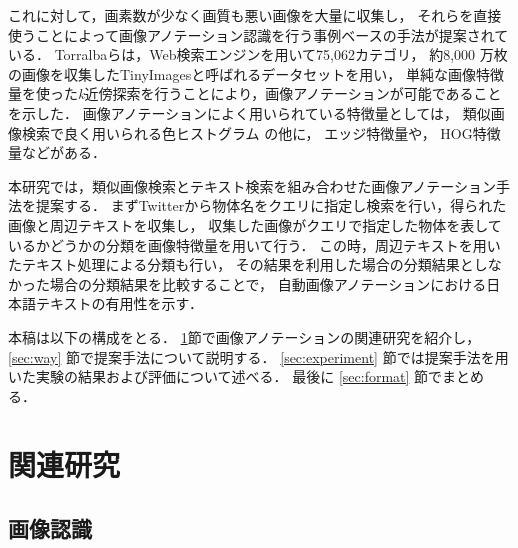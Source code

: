 これに対して，画素数が少なく画質も悪い画像を大量に収集し，
それらを直接使うことによって画像アノテーション認識を行う事例ベースの手法が提案されている．
Torralba\cite{torralba}らは，Web検索エンジンを用いて75,062カテゴリ，
約8,000 万枚の画像を収集したTinyImagesと呼ばれるデータセットを用い，
単純な画像特徴量を使った{\it k}近傍探索を行うことにより，画像アノテーションが可能であることを示した．
%
%
%
画像アノテーションによく用いられている特徴量としては，
類似画像検索で良く用いられる色ヒストグラム
の他に，
エッジ特徴量や，
HOG特徴量\cite{dalal}などがある．

本研究では，類似画像検索とテキスト検索を組み合わせた画像アノテーション手法を提案する．
まずTwitterから物体名をクエリに指定し検索を行い，得られた画像と周辺テキストを収集し，
収集した画像がクエリで指定した物体を表しているかどうかの分類を画像特徴量を用いて行う．
この時，周辺テキストを用いたテキスト処理による分類も行い，
その結果を利用した場合の分類結果としなかった場合の分類結果を比較することで，
自動画像アノテーションにおける日本語テキストの有用性を示す．


本稿は以下の構成をとる．
\ref{sec:related}節で画像アノテーションの関連研究を紹介し，
\ref{sec:way}
節で提案手法について説明する．
\ref{sec:experiment}
節では提案手法を用いた実験の結果および評価について述べる．
最後に
\ref{sec:format}
節でまとめる．

\chapter{関連研究}
\label{sec:related}

\section{画像認識}


